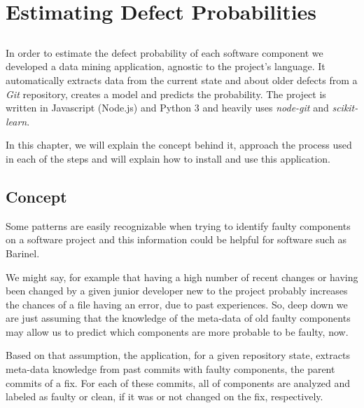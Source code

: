\chapter{Estimating Defect Probabilities} \label{chap:estimating-dp}

\section*{}

In order to estimate the defect probability of each software component we developed a data mining application, agnostic to the project's language.
It automatically extracts data from the current state and about older defects from a \emph{Git} repository, creates a model and predicts the probability. The project is written in Javascript (Node.js) and Python 3 and heavily uses \emph{node-git}
and \emph{scikit-learn}.

In this chapter, we will explain the concept behind it, approach the process used in each of the steps and will explain how to install and use this application.

\section{Concept}

Some patterns are easily recognizable when trying to identify faulty components on a software project and this information could be helpful for software such as Barinel.

We might say, for example that having a high number of recent changes or having been changed by a given junior developer new to the project probably increases the chances of a file having an error, due to past experiences. So, deep down we are just assuming that the knowledge of the meta-data of old faulty components may allow us to predict which components are more probable to be faulty, now.

Based on that assumption, the application, for a given repository state, extracts meta-data knowledge from past commits with faulty components, the parent commits of a fix. For each of these commits, all of components are analyzed and labeled as faulty or clean, if it was or not changed on the fix, respectively.
%
%

